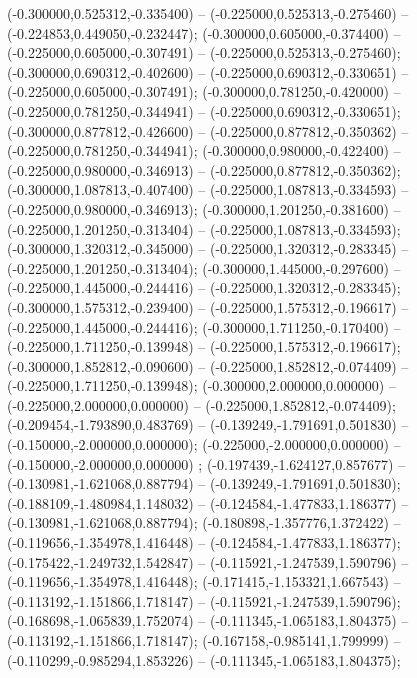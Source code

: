  (-0.300000,0.525312,-0.335400) -- (-0.225000,0.525313,-0.275460) -- (-0.224853,0.449050,-0.232447);
 (-0.300000,0.605000,-0.374400) -- (-0.225000,0.605000,-0.307491) -- (-0.225000,0.525313,-0.275460);
 (-0.300000,0.690312,-0.402600) -- (-0.225000,0.690312,-0.330651) -- (-0.225000,0.605000,-0.307491);
 (-0.300000,0.781250,-0.420000) -- (-0.225000,0.781250,-0.344941) -- (-0.225000,0.690312,-0.330651);
 (-0.300000,0.877812,-0.426600) -- (-0.225000,0.877812,-0.350362) -- (-0.225000,0.781250,-0.344941);
 (-0.300000,0.980000,-0.422400) -- (-0.225000,0.980000,-0.346913) -- (-0.225000,0.877812,-0.350362);
 (-0.300000,1.087813,-0.407400) -- (-0.225000,1.087813,-0.334593) -- (-0.225000,0.980000,-0.346913);
 (-0.300000,1.201250,-0.381600) -- (-0.225000,1.201250,-0.313404) -- (-0.225000,1.087813,-0.334593);
 (-0.300000,1.320312,-0.345000) -- (-0.225000,1.320312,-0.283345) -- (-0.225000,1.201250,-0.313404);
 (-0.300000,1.445000,-0.297600) -- (-0.225000,1.445000,-0.244416) -- (-0.225000,1.320312,-0.283345);
 (-0.300000,1.575312,-0.239400) -- (-0.225000,1.575312,-0.196617) -- (-0.225000,1.445000,-0.244416);
 (-0.300000,1.711250,-0.170400) -- (-0.225000,1.711250,-0.139948) -- (-0.225000,1.575312,-0.196617);
 (-0.300000,1.852812,-0.090600) -- (-0.225000,1.852812,-0.074409) -- (-0.225000,1.711250,-0.139948);
 (-0.300000,2.000000,0.000000) -- (-0.225000,2.000000,0.000000) -- (-0.225000,1.852812,-0.074409);
 (-0.209454,-1.793890,0.483769) -- (-0.139249,-1.791691,0.501830) -- (-0.150000,-2.000000,0.000000);
 (-0.225000,-2.000000,0.000000) -- (-0.150000,-2.000000,0.000000) ;
 (-0.197439,-1.624127,0.857677) -- (-0.130981,-1.621068,0.887794) -- (-0.139249,-1.791691,0.501830);
 (-0.188109,-1.480984,1.148032) -- (-0.124584,-1.477833,1.186377) -- (-0.130981,-1.621068,0.887794);
 (-0.180898,-1.357776,1.372422) -- (-0.119656,-1.354978,1.416448) -- (-0.124584,-1.477833,1.186377);
 (-0.175422,-1.249732,1.542847) -- (-0.115921,-1.247539,1.590796) -- (-0.119656,-1.354978,1.416448);
 (-0.171415,-1.153321,1.667543) -- (-0.113192,-1.151866,1.718147) -- (-0.115921,-1.247539,1.590796);
 (-0.168698,-1.065839,1.752074) -- (-0.111345,-1.065183,1.804375) -- (-0.113192,-1.151866,1.718147);
 (-0.167158,-0.985141,1.799999) -- (-0.110299,-0.985294,1.853226) -- (-0.111345,-1.065183,1.804375);
